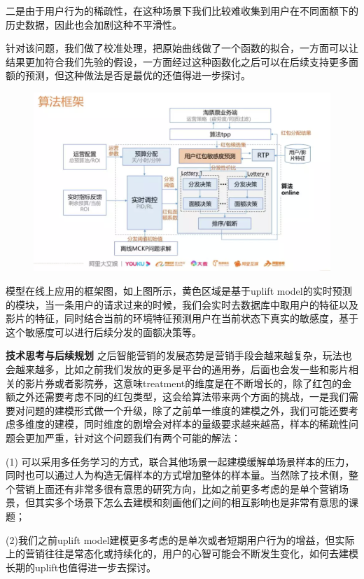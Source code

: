\documentclass[12pt]{article}
\begin{document}
二是由于用户行为的稀疏性，在这种场景下我们比较难收集到用户在不同面额下的历史数据，因此也会加剧这种不平滑性。

针对该问题，我们做了校准处理，把原始曲线做了一个函数的拟合，一方面可以让结果更加符合我们先验的假设，一方面经过这种函数化之后可以在后续支持更多面额的预测，但这种做法是否是最优的还值得进一步探讨。

\begin{figure}[H]
    \centering
    \includegraphics[width=1\textwidth]{fig/CasualInference-Uplift-Model-In-Ali4.png}
\end{figure}

模型在线上应用的框架图，如上图所示，黄色区域是基于uplift model的实时预测的模块，当一条用户的请求过来的时候，我们会实时去数据库中取用户的特征以及影片的特征，同时结合当前的环境特征预测用户在当前状态下真实的敏感度，基于这个敏感度可以进行后续分发的面额决策等。

\textbf{技术思考与后续规划}
之后智能营销的发展态势是营销手段会越来越复杂，玩法也会越来越多，比如之前我们发放的更多是平台的通用券，后面也会发一些和影片相关的影片券或者影院券，这意味treatment的维度是在不断增长的，除了红包的金额之外还需要考虑不同的红包类型，这会给算法带来两个方面的挑战，一是我们需要对问题的建模形式做一个升级，除了之前单一维度的建模之外，我们可能还要考虑多维度的建模，同时维度的剧增会对样本的量级要求越来越高，样本的稀疏性问题会更加严重，针对这个问题我们有两个可能的解法：

(1) 可以采用多任务学习的方式，联合其他场景一起建模缓解单场景样本的压力，同时也可以通过人为构造无偏样本的方式增加整体的样本量。当然除了技术侧，整个营销上面还有非常多很有意思的研究方向，比如之前更多考虑的是单个营销场景，但其实多个场景下怎么去建模和刻画他们之间的相互影响也是非常有意思的课题；

(2)我们之前uplift model建模更多考虑的是单次或者短期用户行为的增益，但实际上的营销往往是常态化或持续化的，用户的心智可能会不断发生变化，如何去建模长期的uplift也值得进一步去探讨。



\end{document}
